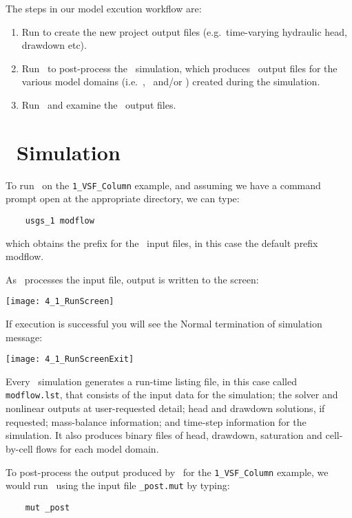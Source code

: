 \label{chapter:ModelExecution}
The steps in our model excution  workflow are:
\begin{enumerate}
    \item Run \mfus to create the new project output files (e.g.\ time-varying hydraulic head, drawdown etc).\label{step:modflow}
    \item Run \mut\ to post-process the \mfus\ simulation, which produces \tecplot\ output files for the various model domains (i.e.\ \gwf, \swf\ and/or \cln ) created during the simulation.\label{step:mut2}
    \item Run \tecplot\ and examine the \mfus\ output files.   \label{step:Tecplot2}
\end{enumerate}

\section{\mfus\ Simulation}
To run \mfus\ on the \texttt{1\_VSF\_Column} example, and assuming we have a command prompt open at the appropriate directory, we can type:
\begin{verbatim}
    usgs_1 modflow
\end{verbatim}
which obtains the prefix for the \mfus\ input files, in this case the default prefix {\sf modflow}.

 As \mfus\ processes the input file, output is written to the screen:

        \texttt{[image: 4\_1\_RunScreen]}

 If execution is successful you will see the {\sf Normal termination of simulation} message:

        \texttt{[image: 4\_1\_RunScreenExit]}

 Every \mfus\ simulation generates a run-time
listing file, in this case called {\tt modflow.lst}, that consists of the input data for the simulation;
the solver and nonlinear outputs at user-requested detail; head
and drawdown solutions, if requested; mass-balance information; and time-step information for the simulation.  It also produces binary files of head, drawdown, saturation and cell-by-cell flows for each model domain.

To post-process the output produced by \mfus\ for the \texttt{1\_VSF\_Column} example, we would  run \mut\ using the input file \texttt{\_post.mut} by typing:
\begin{verbatim}
    mut _post
\end{verbatim}

